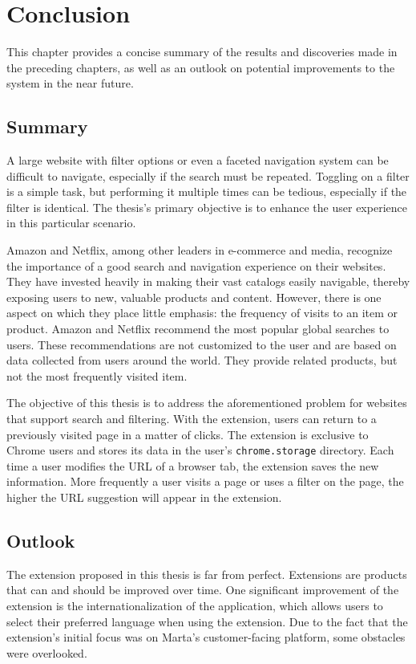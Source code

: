 \newpage
\chapter{Conclusion}
This chapter provides a concise summary of the results and discoveries made in the preceding chapters, as well as an outlook on potential improvements to the system in the near future.

\section{Summary}
A large website with filter options or even a faceted navigation system can be difficult to navigate, especially if the search must be repeated. Toggling on a filter is a simple task, but performing it multiple times can be tedious, especially if the filter is identical. The thesis's primary objective is to enhance the user experience in this particular scenario.

Amazon and Netflix, among other leaders in e-commerce and media, recognize the importance of a good search and navigation experience on their websites. They have invested heavily in making their vast catalogs easily navigable, thereby exposing users to new, valuable products and content. However, there is one aspect on which they place little emphasis: the frequency of visits to an item or product. Amazon and Netflix recommend the most popular global searches to users. These recommendations are not customized to the user and are based on data collected from users around the world. They provide related products, but not the most frequently visited item.

The objective of this thesis is to address the aforementioned problem for websites that support search and filtering. With the extension, users can return to a previously visited page in a matter of clicks. The extension is exclusive to Chrome users and stores its data in the user's \texttt{chrome.storage} directory. Each time a user modifies the URL of a browser tab, the extension saves the new information. More frequently a user visits a page or uses a filter on the page, the higher the URL suggestion will appear in the extension.

\section{Outlook}
The extension proposed in this thesis is far from perfect. Extensions are products that can and should be improved over time. One significant improvement of the extension is the internationalization of the application, which allows users to select their preferred language when using the extension. Due to the fact that the extension's initial focus was on Marta's customer-facing platform, some obstacles were overlooked.

